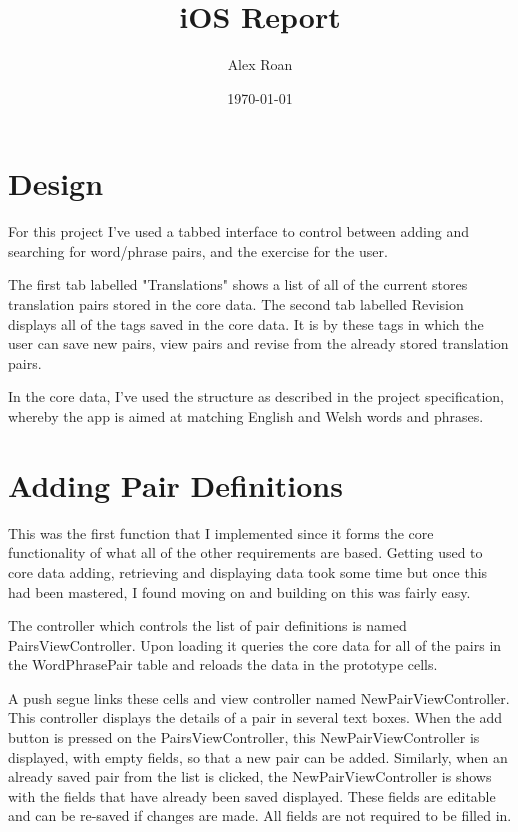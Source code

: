 \documentclass[11pt]{article}
\begin{document}
\title{iOS Report}
\author{Alex Roan}
\date{\today}
\maketitle

\newpage

\tableofcontents

\newpage

\section{Design}
For this project I've used a tabbed interface to control between adding and searching for word/phrase pairs, and the exercise for the user. 

The first tab labelled "Translations" shows a list of all of the current stores translation pairs stored in the core data. The second tab labelled Revision displays all of the tags saved in the core data. It is by these tags in which the user can save new pairs, view pairs and revise from the already stored translation pairs.

In the core data, I've used the structure as described in the project specification, whereby the app is aimed at matching English and Welsh words and phrases.

\section{Adding Pair Definitions}
This was the first function that I implemented since it forms the core functionality of what all of the other requirements are based. Getting used to core data adding, retrieving and displaying data took some time but once this had been mastered, I found moving on and building on this was fairly easy.

The controller which controls the list of pair definitions is named PairsViewController. Upon loading it queries the core data for all of the pairs in the WordPhrasePair table and reloads the data in the prototype cells.

A push segue links these cells and view controller named NewPairViewController. This controller displays the details of a pair in several text boxes. When the add button is pressed on the PairsViewController, this NewPairViewController is displayed, with empty fields, so that a new pair can be added. Similarly, when an already saved pair from the list is clicked, the NewPairViewController is shows with the fields that have already been saved displayed. These fields are editable and can be re-saved if changes are made. All fields are not required to be filled in.
\end{document}
